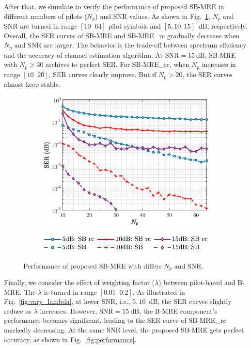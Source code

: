 After that, we simulate to verify the performance of proposed SB-MRE in different numbers of pilots ($N_p$) and SNR values. As shown in Fig.~\ref{fig:vary_N_p}, $N_p$ and SNR are turned in range $[10 \;\; 64]$ pilot symbols and $[5, 10, 15]$~dB, respectively. Overall, the SER curves of SB-MRE and SB-MRE\_rc gradually decrease when $N_p$ and SNR are larger. The behavior is the trade-off between spectrum efficiency and the accuracy of channel estimation algorithm. At $\text{SNR}=15~\text{dB}$, SB-MRE with $N_p > 30$ archives to perfect SER. For SB-MRE\_rc, when $N_p$ increases in range $[10 \;\; 20]$, SER curves clearly improve. But if $N_p > 20$, the SER curves almost keep stable. 
\begin{figure}[ht]
    \centering
    \begin{subfigure}
         \centering
         \includegraphics[width=0.8\linewidth]{figures/vary_N_p_1.eps}
     \end{subfigure}
     \hfill
     \begin{subfigure}
         \centering
         \includegraphics[width=.6\linewidth]{figures/legend.pdf}
     \end{subfigure}
     \hfill
    \caption{Performance of proposed SB-MRE with differs $N_p$ and SNR.}
    \label{fig:vary_N_p}
\end{figure}

Finally, we consider the effect of weighting factor ($\lambda$) between pilot-based and B-MRE. The $\lambda$ is turned in range $[0.01 \;\; 0.2]$. As illustrated in Fig.~\ref{fig:vary_lambda}, at lower SNR, i.e., $5, 10$~dB, the SER curves slightly reduce as $\lambda$ increases. However, $\text{SNR}=15~\text{dB}$, the B-MRE component's performance becomes significant, leading to the SER curve of SB-MRE\_rc markedly decreasing. At the same SNR level, the proposed SB-MRE gets perfect accuracy, as shown in Fig.~\ref{fig:performance}.

